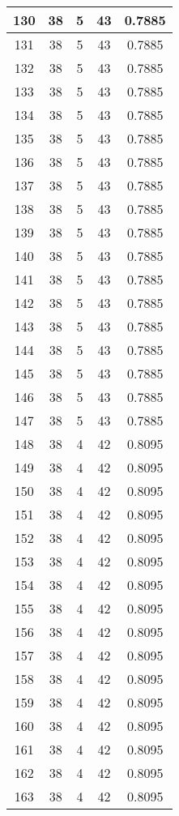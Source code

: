 \documentclass[letterpaper, 12pt]{article}
\begin{document}
\begin{longtable}{|c|c|c|c|c|}
\hline
130 & 38 & 5 & 43 & 0.7885 \\
\hline
131 & 38 & 5 & 43 & 0.7885 \\
\hline
132 & 38 & 5 & 43 & 0.7885 \\
\hline
133 & 38 & 5 & 43 & 0.7885 \\
\hline
134 & 38 & 5 & 43 & 0.7885 \\
\hline
135 & 38 & 5 & 43 & 0.7885 \\
\hline
136 & 38 & 5 & 43 & 0.7885 \\
\hline
137 & 38 & 5 & 43 & 0.7885 \\
\hline
138 & 38 & 5 & 43 & 0.7885 \\
\hline
139 & 38 & 5 & 43 & 0.7885 \\
\hline
140 & 38 & 5 & 43 & 0.7885 \\
\hline
141 & 38 & 5 & 43 & 0.7885 \\
\hline
142 & 38 & 5 & 43 & 0.7885 \\
\hline
143 & 38 & 5 & 43 & 0.7885 \\
\hline
144 & 38 & 5 & 43 & 0.7885 \\
\hline
145 & 38 & 5 & 43 & 0.7885 \\
\hline
146 & 38 & 5 & 43 & 0.7885 \\
\hline
147 & 38 & 5 & 43 & 0.7885 \\
\hline
148 & 38 & 4 & 42 & 0.8095 \\
\hline
149 & 38 & 4 & 42 & 0.8095 \\
\hline
150 & 38 & 4 & 42 & 0.8095 \\
\hline
151 & 38 & 4 & 42 & 0.8095 \\
\hline
152 & 38 & 4 & 42 & 0.8095 \\
\hline
153 & 38 & 4 & 42 & 0.8095 \\
\hline
154 & 38 & 4 & 42 & 0.8095 \\
\hline
155 & 38 & 4 & 42 & 0.8095 \\
\hline
156 & 38 & 4 & 42 & 0.8095 \\
\hline
157 & 38 & 4 & 42 & 0.8095 \\
\hline
158 & 38 & 4 & 42 & 0.8095 \\
\hline
159 & 38 & 4 & 42 & 0.8095 \\
\hline
160 & 38 & 4 & 42 & 0.8095 \\
\hline
161 & 38 & 4 & 42 & 0.8095 \\
\hline
162 & 38 & 4 & 42 & 0.8095 \\
\hline
163 & 38 & 4 & 42 & 0.8095 \\

\end{longtable}
\end{document}
